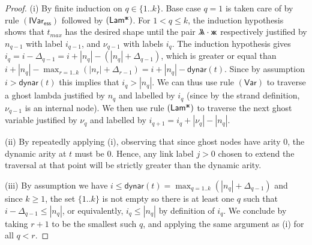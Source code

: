 \documentclass[xchauthor,chkrefs,GCNS,amsmath,amsthm,rotating,leaveRGB]{tcsg}
\theoremstyle{plain}
\theoremstyle{definition}
\newcommand{\essential}{\mathsf{ess}}
\newcommand{\ghostlmd}{{\lambda\mkern-7mu \lambda}}
\newcommand{\ghostvar}{\mathsf{x\mkern-5mu x}}
\newcommand{\dynar}{\textsf{dynar}}
\begin{document}
\begin{proof}
(i) By finite induction on $q\in \{1..k\}$. Base case $q=1$ is taken care of
by rule $\mathsf{(IVar_{\essential}  )}$ followed by
$\mathsf{(Lam^{\ghostvar}  )}$. For $1<q\leq k$, the induction hypothesis
shows that $t_{max}$ has the desired shape until the pair $\ghostlmd \cdot
\ghostvar $ respectively justified by $n_{q-1}$ with label $i_{q-1}$, and
$\nu _{q-1}$ with labels $i_{q}$. The induction hypothesis gives $i_{q} = i -
\Delta _{q-1} = i + |n_{q}| - (|n_{q}| + \Delta _{q-1} )$, which is greater
or equal than $i + |n_{q}| - \max _{r=1..k} ( |n_{r}| + \Delta _{r-1}) = i +
|n_{q}| - \dynar (t) $. Since by assumption $i>\dynar (t)$ this implies that
$i_{q} > |n_{q}|$. We can thus use rule $\mathsf{(Var)}$ to traverse a ghost
lambda justified by  $n_{q}$ and labelled by $i_{q}$ (since by the strand
definition, $\nu _{q-1}$ is an internal node). We then use rule
$\mathsf{(Lam^{\ghostvar}  )}$ to traverse the next ghost variable justified
by $\nu _{q}$ and labelled by $i_{q+1} = i_{q} + |\nu _{q}| -|n_{q}|$.

(ii) By repeatedly applying (i), observing that since ghost nodes have arity
$0$, the dynamic arity at $t$ must be $0$. Hence, any link label $j>0$ chosen
to extend the traversal at that point will be strictly greater than the
dynamic arity.

(iii) By assumption we have $i \leq \dynar (t) = \max _{q=1..k} \left (
|n_{q}| + \Delta _{q-1} \right ) $ and since $k\geq 1$, the set $\{1..k\}$ is
not empty so there is at least one $q$ such that $i - \Delta _{q-1} \leq
|n_{q}|$, or equivalently, $i_{q} \leq |n_{q}|$ by definition of $i_{q}$. We
conclude by taking $r+1$ to be the smallest such $q$, and applying the same
argument as (i) for all $q<r$.
\end{proof}
%
\end{document}
